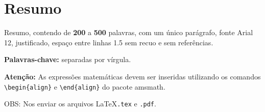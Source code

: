 \documentclass{sm}
\begin{document}
	\mostratitulo
	\mostradados															%
	
	\section{Resumo}
	
	Resumo, contendo de \textbf{200} a \textbf{500} palavras, com um único 
	parágrafo, fonte Arial 12, justificado, espaço entre linhas 1.5 sem recuo e 
	sem referências.
	
	\textbf{Palavras-chave:} separadas por vírgula.

	\vspace{\baselineskip}

	\textbf{Atenção:} As expressões matemáticas devem ser inseridas utilizando 
	os comandos\\ \verb!\begin{align}! e \verb!\end{align}! do pacote amsmath.

	\vspace{\baselineskip}

	OBS: Nos enviar os arquivos \LaTeX \texttt{.tex} e \texttt{.pdf}.
	
\end{document}
